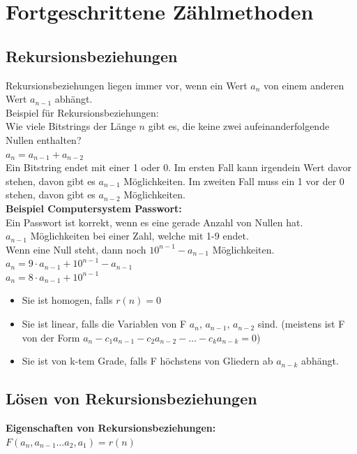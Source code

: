 \documentclass[12pt]{scrartcl}
\begin{document}
\section{Fortgeschrittene Zählmethoden}
\subsection{Rekursionsbeziehungen}
Rekursionsbeziehungen liegen immer vor, wenn ein Wert $a_n$ von einem anderen Wert $a_{n-1}$ abhängt.\\
Beispiel für Rekursionsbeziehungen:\\
Wie viele Bitstrings der Länge $n$ gibt es, die keine zwei aufeinanderfolgende
Nullen enthalten?\\

$a_n = a_{n-1} + a_{n-2}$\\

Ein Bitstring endet mit einer 1 oder 0. Im ersten Fall kann irgendein Wert davor stehen, davon
gibt es $a_{n-1}$ Möglichkeiten. Im zweiten Fall muss ein 1 vor der 0 stehen, davon gibt es $a_{n-2}$ Möglichkeiten.\\


\textbf{Beispiel Computersystem Passwort:}\\
Ein Passwort ist korrekt, wenn es eine gerade Anzahl von Nullen hat.\\

$a_{n-1}$ Möglichkeiten bei einer Zahl, welche mit 1-9 endet.\\
Wenn eine Null steht, dann noch $10^{n-1} - a_{n-1}$ Möglichkeiten.\\

$a_n = 9 \cdot a_{n-1} + 10^{n-1} - a_{n-1}$\\
$a_n = 8 \cdot a_{n-1} + 10^{n-1}$\\

\begin{itemize}
    \item Sie ist homogen, falls $r(n) = 0$
    \item Sie ist linear, falls die Variablen von F $a_n$, $a_{n-1}$, $a_{n-2}$ sind.
    (meistens ist F von der Form $a_n - c_1a_{n-1} - c_2a_{n-2} - \dots - c_ka_{n-k} = 0$)
    \item Sie ist von k-tem Grade, falls F höchstens von Gliedern ab $a_{n-k}$ abhängt.
\end{itemize}

\newpage
\subsection{Lösen von Rekursionsbeziehungen}
\textbf{Eigenschaften von Rekursionsbeziehungen:}\\
$F(a_n, a_{n-1} \dots a_2, a_1) = r(n)$\\
\end{document}
